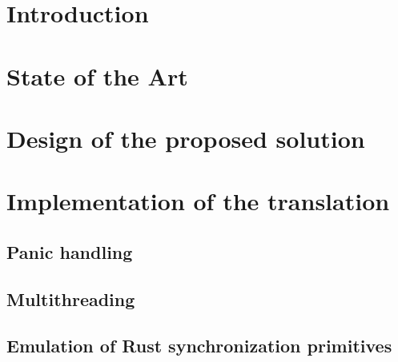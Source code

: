 \documentclass[12pt, oneside]{book}
\begin{document}




\chapter{Introduction}









\chapter{State of the Art}






\chapter{Design of the proposed solution}







\chapter{Implementation of the translation}
\label{chap:implementation}






\section{Panic handling}
\section{Multithreading}
\section{Emulation of Rust synchronization primitives}
\end{document}
